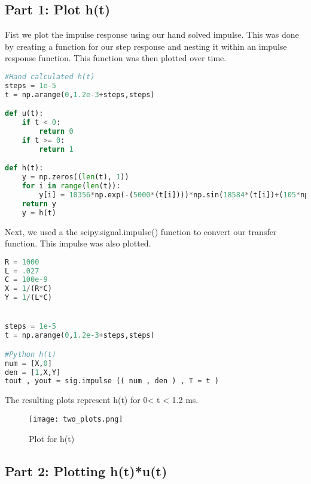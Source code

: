 \documentclass[12pt]{report}
\begin{document}
\vspace{-0.5cm}
\subsection*{Part 1: Plot h(t)}
\setlength{\parindent}{5ex}
Fist we plot the impulse response using our hand solved impulse. This was done by creating a function for our step response and nesting it within an impulse response function. This function was then plotted over time. \par

\begin{lstlisting}[language=Python, caption=Functions for hand calculations]
#Hand calculated h(t)
steps = 1e-5
t = np.arange(0,1.2e-3+steps,steps)

def u(t):
    if t < 0:
        return 0
    if t >= 0:
        return 1

def h(t):
    y = np.zeros((len(t), 1))
    for i in range(len(t)):
        y[i] = 10356*np.exp(-(5000*(t[i])))*np.sin(18584*(t[i])+(105*np.pi/180))*u(t[i])
    return y
    y = h(t)
\end{lstlisting}
 
 \vspace{5mm}
 Next, we used a the scipy.signal.impulse() function to convert our transfer function. This impulse was also plotted. 
 
 \begin{lstlisting}[language=Python, caption=Python function to convert to t domain]
R = 1000
L = .027
C = 100e-9
X = 1/(R*C)
Y = 1/(L*C)


steps = 1e-5
t = np.arange(0,1.2e-3+steps,steps)

#Python h(t)  
num = [X,0]
den = [1,X,Y]
tout , yout = sig.impulse (( num , den ) , T = t )

\end{lstlisting}
 \vspace{5mm}
The resulting plots represent h(t) for 0< t < 1.2 ms.

\begin{figure}[htp]
    \centering
    \texttt{[image: two\_plots.png]}
    \caption{Plot for h(t)}
    \label{fig:ghj}
\end{figure}


\vspace{-\baselineskip}
\vspace{-0.5cm}
\subsection*{Part 2: Plotting h(t)*u(t)}
\setlength{\parindent}{5ex}
\end{document}
